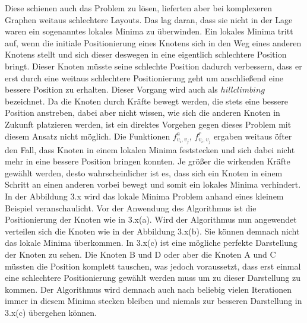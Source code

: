  Diese schienen auch das Problem zu lösen, lieferten aber bei komplexeren Graphen weitaus schlechtere Layouts. Das lag daran, dass sie nicht in der Lage waren ein sogenanntes lokales Minima zu überwinden. Ein lokales Minima tritt auf, wenn die initiale Positionierung eines Knotens sich in den Weg eines anderen Knotens stellt und sich dieser deswegen in eine eigentlich schlechtere Position bringt. Dieser Knoten müsste seine schlechte Position dadurch verbessern, dass er erst durch eine weitaus schlechtere Positionierung geht um anschließend eine bessere Position zu erhalten. Dieser Vorgang wird auch als $hill climbing$ bezeichnet. Da die Knoten durch Kräfte bewegt werden, die stets eine bessere Position anstreben, dabei aber nicht wissen, wie sich die anderen Knoten in Zukunft platzieren werden, ist ein direktes Vorgehen gegen dieses Problem mit diesem Ansatz nicht möglich. Die Funktionen $f^{a}_{v_{i},v_{j}}$, $f^{r}_{v_{i},v_{j}}$ ergaben weitaus öfter den Fall, dass Knoten in einem lokalen Minima feststecken und sich dabei nicht mehr in eine bessere Position bringen konnten. Je größer die wirkenden Kräfte gewählt werden, desto wahrscheinlicher ist es, dass sich ein Knoten in einem Schritt an einen anderen vorbei bewegt und somit ein lokales Minima verhindert. In der Abbildung 3.x wird das lokale Minima Problem anhand eines kleinem Beispiel veranschaulicht. Vor der Anwendung des Algorithmus ist die Positionierung der Knoten wie in 3.x(a). Wird der Algorithmus nun angewendet verteilen sich die Knoten wie in der Abbildung 3.x(b). Sie können demnach nicht das lokale Minima überkommen. In 3.x(c) ist eine mögliche perfekte Darstellung der Knoten zu sehen. Die Knoten B und D oder aber die Knoten A und C müssten die Position komplett tauschen, was jedoch voraussetzt, dass erst einmal eine schlechtere Positionierung gewählt werden muss um zu dieser Darstellung zu kommen. Der Algorithmus wird demnach auch nach beliebig vielen Iterationen immer in diesem Minima stecken bleiben und niemals zur besseren Darstellung in 3.x(c) übergehen können. \\
 
